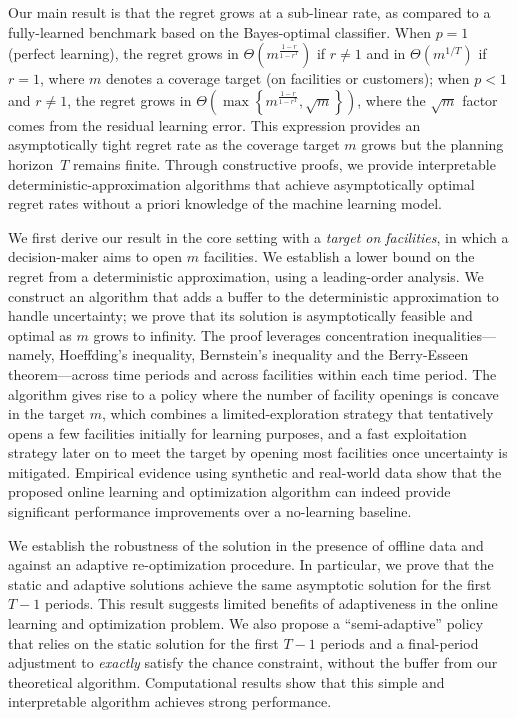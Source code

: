 \documentclass[nonblindrev]{informs3noheader}
\begin{document}
Our main result is that the regret grows at a sub-linear rate, as compared to a fully-learned benchmark based on the Bayes-optimal classifier. When $p=1$ (perfect learning), the regret grows in $\Theta\left(m^{\frac{1-r}{1-r^T}}\right)$ if $r\neq1$ and in $\Theta\left(m^{1/T}\right)$ if $r=1$, where $m$ denotes a coverage target (on facilities or customers); when $p<1$ and $r\neq1$, the regret grows in $\Theta\left(\max\left\{m^{\frac{1-r}{1-r^T}},\sqrt{m}\right\}\right)$, where the $\sqrt{m}$ factor comes from the residual learning error. This expression provides an asymptotically tight regret rate as the coverage target $m$ grows but the planning horizon~$T$ remains finite. Through constructive proofs, we provide interpretable deterministic-approximation algorithms that achieve asymptotically optimal regret rates without a priori knowledge of the machine learning model.

We first derive our result in the core setting with a \textit{target on facilities}, in which a decision-maker aims to open $m$ facilities. We establish a lower bound on the regret from a deterministic approximation, using a leading-order analysis. We construct an algorithm that adds a buffer to the deterministic approximation to handle uncertainty; we prove that its solution is asymptotically feasible and optimal as $m$ grows to infinity. The proof leverages concentration inequalities---namely, Hoeffding's inequality, Bernstein's inequality and the Berry-Esseen theorem---across time periods and across facilities within each time period. The algorithm gives rise to a policy where the number of facility openings is concave in the target $m$, which combines a limited-exploration strategy that tentatively opens a few facilities initially for learning purposes, and a fast exploitation strategy later on to meet the target by opening most facilities once uncertainty is mitigated. Empirical evidence using synthetic and real-world data show that the proposed online learning and optimization algorithm can indeed provide significant performance improvements over a no-learning baseline.

We establish the robustness of the solution in the presence of offline data and against an adaptive re-optimization procedure. In particular, we prove that the static and adaptive solutions achieve the same asymptotic solution for the first $T-1$ periods. This result suggests limited benefits of adaptiveness in the online learning and optimization problem. We also propose a ``semi-adaptive'' policy that relies on the static solution for the first $T-1$ periods and a final-period adjustment to \textit{exactly} satisfy the chance constraint, without the buffer from our theoretical algorithm. Computational results show that this simple and interpretable algorithm achieves strong performance.
\end{document}
